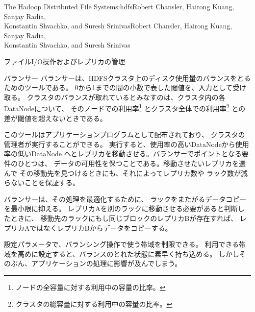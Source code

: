 \begin{aosachaptertoc}{The Hadoop Distributed File System}{s:hdfs}{Robert Chansler, Hairong Kuang, Sanjay Radia, \\ Konstantin Shvachko, and Suresh Srinivas}{Robert Chansler, Hairong Kuang, Sanjay Radia, \\ \hspace*{0.9cm} Konstantin Shvachko, and Suresh Srinivas}
\begin{aosasect1}{ファイルI/O操作およびレプリカの管理}
\begin{aosasect2}{バランサー}
バランサーは、HDFSクラスタ上のディスク使用量のバランスをとるためのツールである。
0から1までの間の小数で表した閾値を、入力として受け取る。
クラスタのバランスが取れているとみなすのは、クラスタ内の各DataNodeについて、
そのノードでの利用率\footnote{ノードの全容量に対する利用中の容量の比率。}
とクラスタ全体での利用率\footnote{クラスタの総容量に対する利用中の容量の比率。}
との差が閾値を超えないときである。

このツールはアプリケーションプログラムとして配布されており、
クラスタの管理者が実行することができる。
実行すると、使用率の高いDataNodeから使用率の低いDataNode
へとレプリカを移動させる。バランサーでポイントとなる要件のひとつは、
データの可用性を保つことである。移動させたいレプリカを選んで
その移動先を見つけるときにも、それによってレプリカ数や
ラック数が減らないことを保証する。

バランサーは、その処理を最適化するために、
ラックをまたがるデータコピーを最小限に抑える。
レプリカAを別のラックに移動させる必要があると判断したときに、
移動先のラックにもし同じブロックのレプリカBが存在すれば、
レプリカAではなくレプリカBからデータをコピーする。

設定パラメータで、バランシング操作で使う帯域を制限できる。
利用できる帯域を高めに設定すると、バランスのとれた状態に素早く持ち込める。
しかしそのぶん、アプリケーションの処理に影響が及んでしまう。


\end{aosasect2}
\end{aosasect1}
\end{aosachaptertoc}
